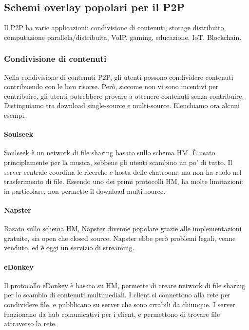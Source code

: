 \documentclass[11pt]{article}
\begin{document}
\subsection{Schemi overlay popolari per il P2P}
Il P2P ha varie applicazioni: condivisione di contenuti, storage distribuito, computazione parallela/distribuita, VoIP, gaming, educazione, IoT, Blockchain.
\subsubsection{Condivisione di contenuti}
Nella condivisione di contenuti P2P, gli utenti possono condividere contenuti contribuendo con le loro risorse. Però, siccome non vi sono incentivi per contribuire, gli utenti potrebbero provare a ottenere contenuti senza contribuire. Distinguiamo tra download single-source e multi-source. Elenchiamo ora alcuni esempi.
\paragraph{Soulseek} Soulseek è un network di file sharing basato sullo schema HM. È usato principlamente per la musica, sebbene gli utenti scambino un po' di tutto. Il server centrale coordina le ricerche e hosta delle chatroom, ma non ha ruolo nel trasferimento di file. Essendo uno dei primi protocolli HM, ha molte limitazioni: in particolare, non permette il download multi-source.

\paragraph{Napster} Basato sullo schema HM, Napster divenne popolare grazie alle implementazioni gratuite, sia open che closed source. Napster ebbe però problemi legali, venne venduto, ed è oggi un servizio di streaming.

\paragraph{eDonkey} Il protocollo eDonkey è basato su HM, permette di creare network di file sharing per lo scambio di contenuti multimediali. I client si connettono alla rete per condividere file, e pubblicano su server che sono crrabili da chiunque. I server funzionano da hub comunicativi per i client, e permettono di trovare file attraverso la rete. 
\end{document}
